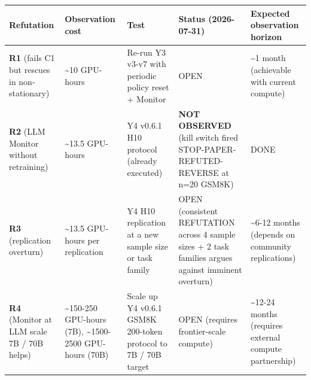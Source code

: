 \documentclass[11pt]{article}
\begin{document}
{\def\LTcaptype{none} %
\begin{longtable}[]{@{}
  >{\raggedright\arraybackslash}p{}
  >{\raggedright\arraybackslash}p{}
  >{\raggedright\arraybackslash}p{}
  >{\raggedright\arraybackslash}p{}
  >{\raggedright\arraybackslash}p{}@{}}
\toprule\noalign{}
\begin{minipage}[b]{\linewidth}\raggedright
Refutation
\end{minipage} & \begin{minipage}[b]{\linewidth}\raggedright
Observation cost
\end{minipage} & \begin{minipage}[b]{\linewidth}\raggedright
Test
\end{minipage} & \begin{minipage}[b]{\linewidth}\raggedright
Status (2026-07-31)
\end{minipage} & \begin{minipage}[b]{\linewidth}\raggedright
Expected observation horizon
\end{minipage} \\
\midrule\noalign{}
\endhead
\bottomrule\noalign{}
\endlastfoot
\textbf{R1} (fails C1 but rescues in non-stationary) & \textasciitilde10
GPU-hours & Re-run Y3 v3-v7 with periodic policy reset + Monitor & OPEN
& \textasciitilde1 month (achievable with current compute) \\
\textbf{R2} (LLM Monitor without retraining) & \textasciitilde13.5
GPU-hours & Y4 v0.6.1 H10 protocol (already executed) & \textbf{NOT
OBSERVED} (kill switch fired STOP-PAPER-REFUTED-REVERSE at n=20 GSM8K) &
DONE \\
\textbf{R3} (replication overturn) & \textasciitilde13.5 GPU-hours per
replication & Y4 H10 replication at a new sample size or task family &
OPEN (consistent REFUTATION across 4 sample sizes + 2 task families
argues against imminent overturn) & \textasciitilde6-12 months (depends
on community replications) \\
\textbf{R4} (Monitor at LLM scale 7B / 70B helps) &
\textasciitilde150-250 GPU-hours (7B), \textasciitilde1500-2500
GPU-hours (70B) & Scale up Y4 v0.6.1 GSM8K 200-token protocol to 7B /
70B target & OPEN (requires frontier-scale compute) &
\textasciitilde12-24 months (requires external compute partnership) \\
\end{longtable}
}
\end{document}
